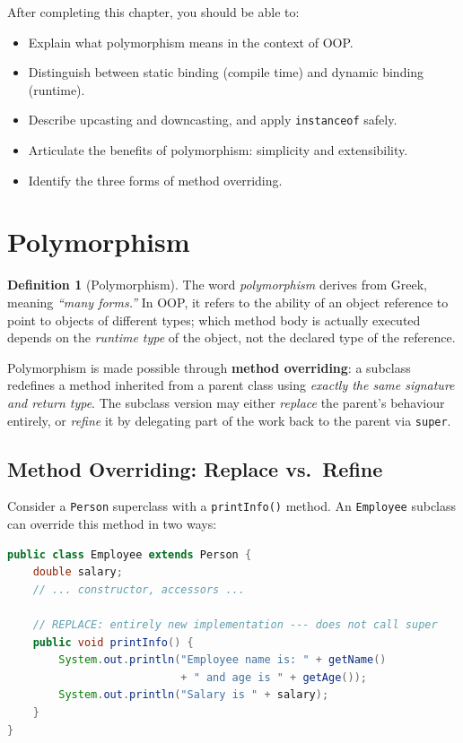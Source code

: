\documentclass[11pt, a4paper, notitlepage]{report}
\theoremstyle{definition}
\newtheorem{definition}[theorem]{Definition}
\theoremstyle{remark}
\theoremstyle{definition}
\begin{document}
After completing this chapter, you should be able to:
\begin{itemize}
  \item Explain what polymorphism means in the context of OOP.
  \item Distinguish between static binding (compile time) and dynamic binding (runtime).
  \item Describe upcasting and downcasting, and apply \texttt{instanceof} safely.
  \item Articulate the benefits of polymorphism: simplicity and extensibility.
  \item Identify the three forms of method overriding.
\end{itemize}

\section{Polymorphism}
\label{sec:ch5-polymorphism}

\begin{definition}[Polymorphism]
\label{def:ch5-polymorphism}
The word \emph{polymorphism} derives from Greek, meaning \emph{``many forms.''}  In OOP, it refers to the ability of an object reference to point to objects of different types; which method body is actually executed depends on the \emph{runtime type} of the object, not the declared type of the reference.
\end{definition}

Polymorphism is made possible through \textbf{method overriding}: a subclass redefines a method inherited from a parent class using \emph{exactly the same signature and return type}.  The subclass version may either \emph{replace} the parent's behaviour entirely, or \emph{refine} it by delegating part of the work back to the parent via \texttt{super}.

\subsection{Method Overriding: Replace vs.\ Refine}
\label{sec:ch5-override-replace-refine}

Consider a \texttt{Person} superclass with a \texttt{printInfo()} method.  An \texttt{Employee} subclass can override this method in two ways:

\begin{lstlisting}[language=Java, caption={Replace: \texttt{printInfo()} is completely rewritten in \texttt{Employee}.}]
public class Employee extends Person {
    double salary;
    // ... constructor, accessors ...

    // REPLACE: entirely new implementation --- does not call super
    public void printInfo() {
        System.out.println("Employee name is: " + getName()
                           + " and age is " + getAge());
        System.out.println("Salary is " + salary);
    }
}
\end{lstlisting}
\end{document}
